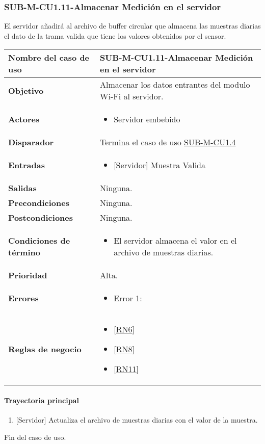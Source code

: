 \subsubsection{SUB-M-CU1.11-Almacenar Medición en el servidor}\label{SUB-M-CU1.11}
El servidor añadirá al archivo de buffer circular que almacena las muestras diarias el dato de la trama valida que tiene los valores obtenidos por el sensor. 

\begin{longtable}{|J{5cm}|J{10.3cm}|}
	\hline
	\textbf{Nombre del caso de uso} &
		SUB-M-CU1.11-Almacenar Medición en el servidor \\ \hline
	\textbf{Objetivo} &
		Almacenar los datos entrantes del modulo Wi-Fi al servidor. \\ \hline
	\textbf{Actores} &
		\begin{itemize}
			\item Servidor embebido
		\end{itemize} \\ \hline
	\textbf{Disparador} & 
	    Termina el caso de uso \hyperref[SUB-M-CU1.4]{SUB-M-CU1.4} \\ \hline 
	\textbf{Entradas} & 
		\begin{itemize}
				\item{[Servidor]} Muestra Valida
		\end{itemize}\\ \hline 
	\textbf{Salidas} & 
        Ninguna. \\ \hline
	\textbf{Precondiciones} &
		Ninguna. \\ \hline
	\textbf{Postcondiciones} &
		Ninguna.\\ \hline
	\textbf{Condiciones de término} & 
		\begin{itemize}
			\item El servidor almacena el valor en el archivo de muestras diarias.
		\end{itemize} \\ \hline 
	\textbf{Prioridad} & 
		Alta. \\ \hline
	\textbf{Errores} & 
		\begin{itemize}
		    \item \label{CU5:Error1} Error 1: 
		\end{itemize} \\ \hline
	\textbf{Reglas de negocio} & 
		\begin{itemize}
		    \item \ref{RN6}
			\item \ref{RN8}
			\item \ref{RN11}
		\end{itemize} \\ \hline

\end{longtable}

\paragraph{Trayectoria principal}
    \label{SUB-M-CU1.5:TP}
	\begin{enumerate}
	    \item {[Servidor]} Actualiza el archivo de muestras diarias con el valor de la muestra.
	\end{enumerate}
	Fin del caso de uso.
